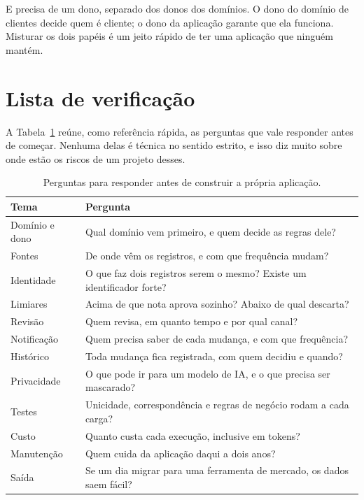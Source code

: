 E precisa de um dono, separado dos donos dos domínios. O dono do domínio de clientes decide
quem é cliente; o dono da aplicação garante que ela funciona. Misturar os dois papéis é um
jeito rápido de ter uma aplicação que ninguém mantém.


\section{Lista de verificação}
\label{sec:checklist-aplicacao}

A Tabela~\ref{tab:checklist-aplicacao} reúne, como referência rápida, as perguntas que vale
responder antes de começar. Nenhuma delas é técnica no sentido estrito, e isso diz muito
sobre onde estão os riscos de um projeto desses.

\begin{table}[htbp]
  \centering
  \caption{Perguntas para responder antes de construir a própria aplicação.}
  \label{tab:checklist-aplicacao}
  \small
  \begin{tabularx}{\textwidth}{@{}>{\raggedright\arraybackslash}p{}
      >{\raggedright\arraybackslash}X@{}}
    \toprule
    Tema & Pergunta \\
    \midrule
    Domínio e dono & Qual domínio vem primeiro, e quem decide as regras dele? \\
    Fontes & De onde vêm os registros, e com que frequência mudam? \\
    Identidade & O que faz dois registros serem o mesmo? Existe um identificador forte? \\
    Limiares & Acima de que nota aprova sozinho? Abaixo de qual descarta? \\
    Revisão & Quem revisa, em quanto tempo e por qual canal? \\
    Notificação & Quem precisa saber de cada mudança, e com que frequência? \\
    Histórico & Toda mudança fica registrada, com quem decidiu e quando? \\
    Privacidade & O que pode ir para um modelo de IA, e o que precisa ser mascarado? \\
    Testes & Unicidade, correspondência e regras de negócio rodam a cada carga? \\
    Custo & Quanto custa cada execução, inclusive em tokens? \\
    Manutenção & Quem cuida da aplicação daqui a dois anos? \\
    Saída & Se um dia migrar para uma ferramenta de mercado, os dados saem fácil? \\
    \bottomrule
  \end{tabularx}
\end{table}


